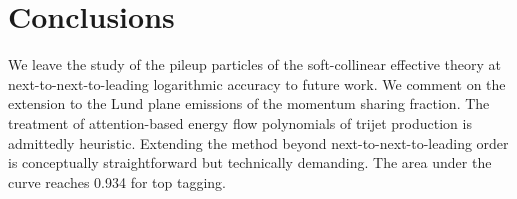 \section{Conclusions}\label{sec:conclusions}

We leave the study of the pileup particles of the soft-collinear
effective theory at next-to-next-to-leading logarithmic accuracy to
future work. We comment on the extension to the Lund plane emissions of
the momentum sharing fraction. The treatment of attention-based energy
flow polynomials of trijet production is admittedly heuristic. Extending
the method beyond next-to-next-to-leading order is conceptually
straightforward but technically demanding. The area under the curve
reaches 0.934 for top tagging.

